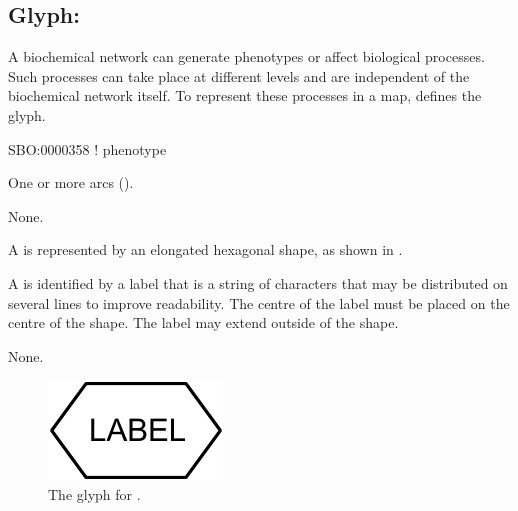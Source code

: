 \subsection{Glyph: }
\label{sec:phenotype}

A biochemical network can generate phenotypes or affect biological processes.
Such processes can take place at different levels and are independent of the biochemical network itself.
To represent these processes in a map, \PD defines the  glyph.

\begin{glyphDescription}

\glyphSboTerm
SBO:0000358 ! phenotype


\glyphIncoming
One or more  arcs ().



\glyphOutgoing
None.


\glyphContainer
A  is represented by an elongated hexagonal shape, as shown in .

\glyphLabel
A  is identified by a label that is  a string of characters that may be distributed on several lines to improve readability.
The centre of the label must be placed on the centre of the shape.
The label may extend outside of the shape.

\glyphAux 
None.

\end{glyphDescription}

\begin{figure}[H]
  \centering
  \includegraphics{images/phenotype}
  \caption{The \PD glyph for .}
  \label{fig:phenotype}
\end{figure}

